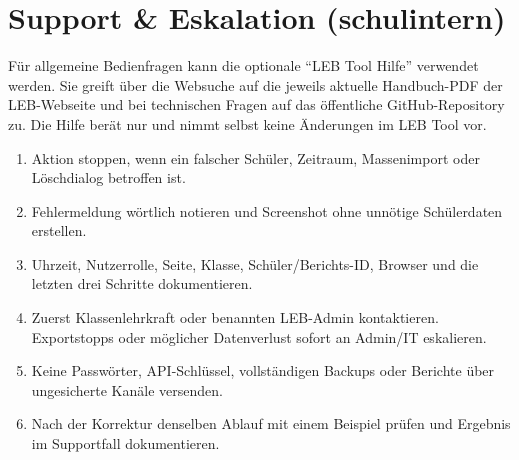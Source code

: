 \documentclass[12pt,a4paper]{article}
\begin{document}
\section{Support \& Eskalation (schulintern)}
Für allgemeine Bedienfragen kann die optionale \enquote{LEB Tool Hilfe} verwendet werden. Sie greift über die Websuche auf die jeweils aktuelle Handbuch-PDF der LEB-Webseite und bei technischen Fragen auf das öffentliche GitHub-Repository zu. Die Hilfe berät nur und nimmt selbst keine Änderungen im LEB Tool vor.
\begin{enumerate}
  \item Aktion stoppen, wenn ein falscher Schüler, Zeitraum, Massenimport oder Löschdialog betroffen ist.
  \item Fehlermeldung wörtlich notieren und Screenshot ohne unnötige Schülerdaten erstellen.
  \item Uhrzeit, Nutzerrolle, Seite, Klasse, Schüler/Berichts-ID, Browser und die letzten drei Schritte dokumentieren.
  \item Zuerst Klassenlehrkraft oder benannten LEB-Admin kontaktieren. Exportstopps oder möglicher Datenverlust sofort an Admin/IT eskalieren.
  \item Keine Passwörter, API-Schlüssel, vollständigen Backups oder Berichte über ungesicherte Kanäle versenden.
  \item Nach der Korrektur denselben Ablauf mit einem Beispiel prüfen und Ergebnis im Supportfall dokumentieren.
\end{enumerate}
\end{document}
